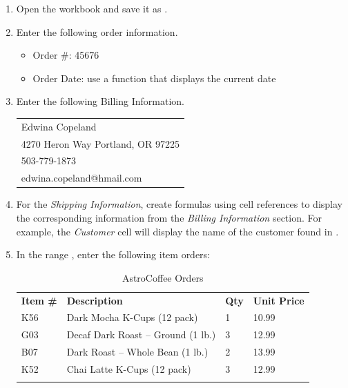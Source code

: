 \begin{enumerate}
	\item Open the  workbook and save it as .
\item Enter the following order information.
\begin{itemize}
	\item Order \#: 45676
	\item Order Date: use a function that displays the current date
\end{itemize}

\item Enter the following Billing Information.

\begin{tabular}{l}
	\hline
	Edwina Copeland\\
	4270 Heron Way Portland, OR 97225\\
	503-779-1873\\
	edwina.copeland@hmail.com\\
	\hline
\end{tabular}

\item For the \textit{Shipping Information}, create formulas using cell references to display the corresponding information from the \textit{Billing Information} section. For example, the \textit{Customer} cell will display the name of the customer found in .
\item In the range , enter the following item orders:

{\small
	\begin{longtable}{p{0.4in}p{2.10in}p{0.25in}p{0.5in}} %
		\textbf{Item \#} & \textbf{Description} & \textbf{Qty} & \textbf{Unit Price}\endhead
		\hline \\
		K56 & Dark Mocha K-Cups (12 pack) & 1 & 10.99\\
		G03 & Decaf Dark Roast – Ground (1 lb.) & 3 & 12.99\\
		B07 & Dark Roast – Whole Bean (1 lb.) & 2 & 13.99\\
		K52 & Chai Latte K-Cups (12 pack) & 3 & 12.99\\
		\caption{AstroCoffee Orders}
		\label{03:tab02}
	\end{longtable}
}


\end{enumerate}
